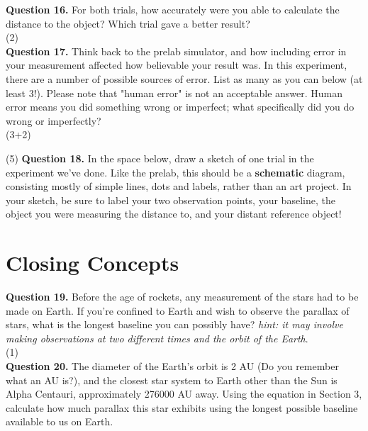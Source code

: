 \documentclass[11pt]{article}
\begin{document}
\textbf{Question 16.} For both trials, how accurately were you able to calculate the distance to the object? Which trial gave a better result?\\

\vspace{1.5cm}
(2) \hrulefill\\

\textbf{Question 17.} Think back to the prelab simulator, and how including error in your measurement affected how believable your result was. In this experiment, there are a number of possible sources of error. List as many as you can below (at least 3!). Please note that "human error" is not an acceptable answer. Human error means you did something wrong or imperfect; what specifically did you do wrong or imperfectly?\\

\vspace{4.5cm}
(3+2)\hrulefill

\newpage

(5) \textbf{Question 18.} In the space below, draw a sketch of one trial in the experiment we've done. Like the prelab, this should be a \textbf{schematic} diagram, consisting mostly of simple lines, dots and labels, rather than an art project. In your sketch, be sure to label your two observation points, your baseline, the object you were measuring the distance to, and your distant reference object!

\newpage

\section{Closing Concepts}
\textbf{Question 19.} Before the age of rockets, any measurement of the stars had to be made on Earth. If you're confined to Earth and wish to observe the parallax of stars, what is the longest baseline you can possibly have? \textit{hint: it may involve making observations at two different times and the orbit of the Earth}.\\

\vspace{1.5cm}
(1) \hrulefill\\

\textbf{Question 20.} The diameter of the Earth's orbit is 2 AU (Do you remember what an AU is?), and the closest star system to Earth other than the Sun is Alpha Centauri, approximately 276000 AU away. Using the equation in Section 3, calculate how much parallax this star exhibits using the longest possible baseline available to us on Earth.\\
\end{document}
